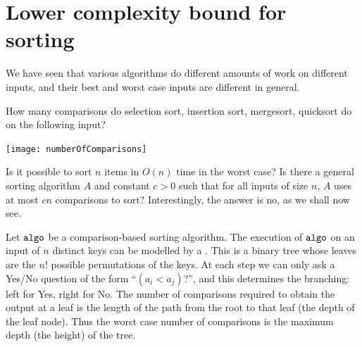 \chapter{Lower complexity bound for sorting} %
\label{sec:lowerbound}
We have seen that various algorithms do different amounts of work on different inputs, 
and their best and worst case inputs are different in general.

\begin{Boxample}
How many comparisons do selection sort, insertion sort, mergesort, quicksort do on the following input?
\begin{center}
\texttt{[image: numberOfComparisons]}
\end{center}
\end{Boxample} 

Is it possible to sort $n$ items in $O(n)$ time in the worst case? 
Is there a general sorting algorithm $A$ and constant $c>0$ such that for all inputs of size $n$, 
$A$ uses at most $cn$ comparisons to sort? Interestingly, the answer is no, as we shall now see.

Let $\operatorname{\text{\texttt{algo}}}$ be a comparison-based sorting algorithm. 
The execution of $\operatorname{\text{\texttt{algo}}}$ on an input of $n$ distinct keys can be modelled by a . 
This is a binary tree whose leaves are the $n!$ possible permutations of the keys. 
At each step we can only ask a Yes/No question of the form ``$(a_i < a_j)$?'', and this determines the branching: 
left for Yes, right for No. 
The number of comparisons required to obtain the output at a leaf is the 
length of the path from the root to that leaf (the depth of the leaf node). 
Thus the worst case number of comparisons is the maximum depth (the height) of the tree.

